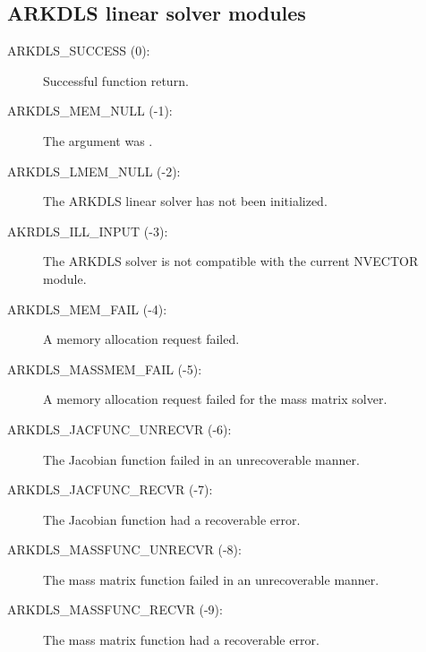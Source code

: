 \documentclass[letterpaper,10pt,english]{sphinxmanual}
\begin{document}
\subsection{ARKDLS linear solver modules}
\label{Constants:arkdls-linear-solver-modules}\begin{description}
\item[{ARKDLS\_SUCCESS  (0):}] \leavevmode
Successful function return.

\item[{ARKDLS\_MEM\_NULL  (-1):}] \leavevmode
The  argument was .

\item[{ARKDLS\_LMEM\_NULL  (-2):}] \leavevmode
The ARKDLS linear solver has not been initialized.

\item[{AKRDLS\_ILL\_INPUT  (-3):}] \leavevmode
The ARKDLS solver is not compatible with
the current NVECTOR module.

\item[{ARKDLS\_MEM\_FAIL  (-4):}] \leavevmode
A memory allocation request failed.

\item[{ARKDLS\_MASSMEM\_FAIL  (-5):}] \leavevmode
A memory allocation request failed for the mass matrix solver.

\item[{ARKDLS\_JACFUNC\_UNRECVR  (-6):}] \leavevmode
The Jacobian function failed in an
unrecoverable manner.

\item[{ARKDLS\_JACFUNC\_RECVR  (-7):}] \leavevmode
The Jacobian function had a recoverable error.

\item[{ARKDLS\_MASSFUNC\_UNRECVR  (-8):}] \leavevmode
The mass matrix function failed in an
unrecoverable manner.

\item[{ARKDLS\_MASSFUNC\_RECVR  (-9):}] \leavevmode
The mass matrix function had a recoverable error.

\end{description}
\end{document}

